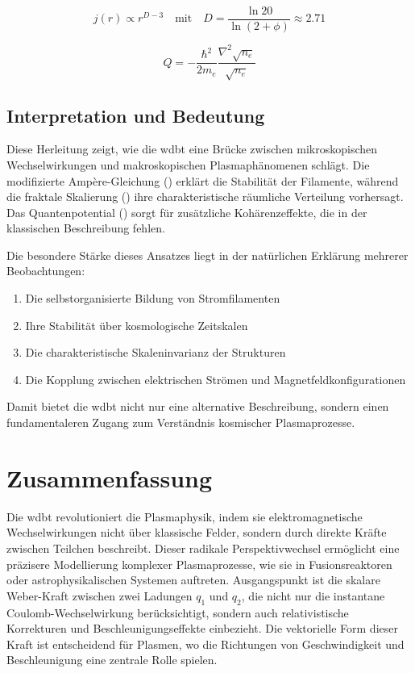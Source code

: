 \begin{equation}
    \label{eq:fractal_scaling}
    j(r) \propto r^{D-3} \quad \text{mit} \quad D = \frac{\ln 20}{\ln(2+\phi)} \approx 2.71
\end{equation}

\begin{equation}
    \label{eq:quantenpotential_plasma}
    Q = -\frac{\hbar^2}{2m_e} \frac{\nabla^2 \sqrt{n_e}}{\sqrt{n_e}}
\end{equation}

\subsection{Interpretation und Bedeutung}
Diese Herleitung zeigt, wie die \gls{wdbt} eine Brücke zwischen mikroskopischen Wechselwirkungen und makroskopischen Plasmaphänomenen schlägt. Die modifizierte
Ampère-Gleichung () erklärt die Stabilität der Filamente, während die fraktale Skalierung () ihre charakteristische räumliche
Verteilung vorhersagt. Das Quantenpotential () sorgt für zusätzliche Kohärenzeffekte, die in der klassischen Beschreibung fehlen.

Die besondere Stärke dieses Ansatzes liegt in der natürlichen Erklärung mehrerer Beobachtungen:

\begin{enumerate}
    \item Die selbstorganisierte Bildung von Stromfilamenten
    \item Ihre Stabilität über kosmologische Zeitskalen
    \item Die charakteristische Skaleninvarianz der Strukturen
    \item Die Kopplung zwischen elektrischen Strömen und Magnetfeldkonfigurationen
\end{enumerate}

Damit bietet die \gls{wdbt} nicht nur eine alternative Beschreibung, sondern einen fundamentaleren Zugang zum Verständnis kosmischer Plasmaprozesse.

\section{Zusammenfassung}
Die \gls{wdbt} revolutioniert die Plasmaphysik, indem sie elektromagnetische Wechselwirkungen nicht über klassische Felder, sondern durch direkte Kräfte zwischen Teilchen beschreibt.
Dieser radikale Perspektivwechsel ermöglicht eine präzisere Modellierung komplexer Plasmaprozesse, wie sie in Fusionsreaktoren oder astrophysikalischen Systemen auftreten.
Ausgangspunkt ist die skalare Weber-Kraft zwischen zwei Ladungen $q_1$ und $q_2$, die nicht nur die instantane Coulomb-Wechselwirkung berücksichtigt, sondern auch relativistische
Korrekturen und Beschleunigungseffekte einbezieht. Die vektorielle Form dieser Kraft ist entscheidend für Plasmen, wo die Richtungen von Geschwindigkeit und Beschleunigung eine
zentrale Rolle spielen.

